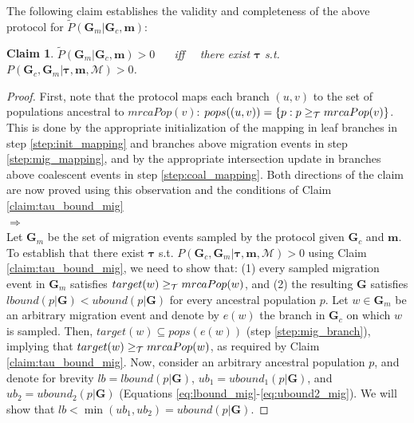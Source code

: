 \documentclass[11pt]{article}
\newcommand{\vect}[1]{\boldsymbol{\mathbf{#1}}}
\newcommand{\M}{\mathcal{M}}
\newcommand{\G}{\vect{G}}
\newcommand{\Pref}{\widetilde{P}}
\newcommand{\1}{\mathbbm{1}}
\newcommand{\Gc}{\G_c}
\newcommand{\Gm}{\G_m}
\newtheorem{claim}{Claim}
\newcommand{\taus}{\vect\tau}
\newcommand{\migs}{\vect{m}}
\begin{document}
The following claim establishes the validity and completeness of the above protocol for $\Pref(\Gm|\Gc,\migs)$:
%
%
\begin{claim}\label{claim:protocol}
 $\Pref(\Gm|\Gc,\migs)>0$ ~~ iff ~~there exist $\taus$ s.t. $P(\Gc,\Gm|\taus,\migs,\M)>0$.
\end{claim}
%
%
\begin{proof}
 First, note that the protocol maps each branch $(u,v)$ to the set of populations ancestral to $mrcaPop(v)$: $pops((u,v))=\{p:p\geq_{\mathcal{T}} mrcaPop(v)\}$.
 This is done by the appropriate initialization of the mapping in leaf branches in step \ref{step:init_mapping} and branches above migration events in step \ref{step:mig_mapping},
 and by the appropriate intersection update in branches above coalescent events in step \ref{step:coal_mapping}.
 Both directions of the claim are now proved using this observation and the conditions of Claim \ref{claim:tau_bound_mig}\\
 $\Rightarrow$\\
 Let $\Gm$ be the set of migration events sampled by the protocol given $\Gc$ and $\migs$.
 To establish that there exist $\taus$ s.t. $P(\Gc,\Gm|\taus,\migs,\M)>0$ using Claim \ref{claim:tau_bound_mig}, we need to show that:
 (1) every sampled migration event in $\Gm$ satisfies  $target(w)\geq_{\mathcal{T}} mrcaPop(w)$, and
 (2) the resulting $\G$ satisfies $lbound(p|\G)<ubound(p|\G)$ for every ancestral population $p$.
 Let $w\in\Gm$ be an arbitrary migration event and denote by $e(w)$ the branch in $\Gc$ on which $w$ is sampled.
 Then, $target(w)\subseteq pops(e(w))$ (step \ref{step:mig_branch}), implying that $target(w)\geq_{\mathcal{T}} mrcaPop(w)$, as required by Claim \ref{claim:tau_bound_mig}.
 Now, consider an arbitrary ancestral population $p$, and denote for brevity $lb=lbound(p|\G)$, $ub_1=ubound_1(p|\G)$, and $ub_2=ubound_2(p|\G)$ (Equations \ref{eq:lbound_mig}-\ref{eq:ubound2_mig}).
 We will show that $lb<\min(ub_1,ub_2) = ubound(p|\G)$.
 

\end{proof}
\end{document}
